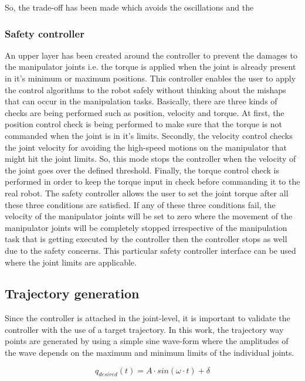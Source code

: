 So, the trade-off has been made which avoids the oscillations and the 

\subsubsection*{Safety controller}
An upper layer has been created around the controller to prevent the damages to the manipulator joints i.e. the torque is applied when the joint is already present in it's minimum or maximum positions. This controller enables the user to apply the control algorithms to the robot safely without thinking about the mishaps that can occur in the manipulation tasks. Basically, there are three kinds of checks are being performed such as position, velocity and torque. At first, the position control check is being performed to make sure that the torque is not commanded when the joint is in it's limits. Secondly, the velocity control checks the joint velocity for avoiding the high-speed motions on the manipulator that might hit the joint limits. So, this mode stops the controller when the velocity of the joint goes over the defined threshold. Finally, the torque control check is performed in order to keep the torque input in check before commanding it to the real robot. The safety controller allows the user to set the joint torque after all these three conditions are satisfied. If any of these three conditions fail, the velocity of the manipulator joints will be set to zero where the movement of the manipulator joints will be completely stopped irrespective of the manipulation task that is getting executed by the controller then the controller stops as well due to the safety concerns. This particular safety controller interface can be used where the joint limits are applicable.

\newpage
\subsection{Trajectory generation}

Since the controller is attached in the joint-level, it is important to validate the controller with the use of a target trajectory. In this work, the trajectory way points are generated by using a simple sine wave-form where the amplitudes of the wave depends on the maximum and minimum limits of the individual joints.

\begin{equation}
q_{desired}(t) = A\cdot sin(\omega \cdot t) + \delta
\label{eq:analyticalsinewave}
\end{equation}

